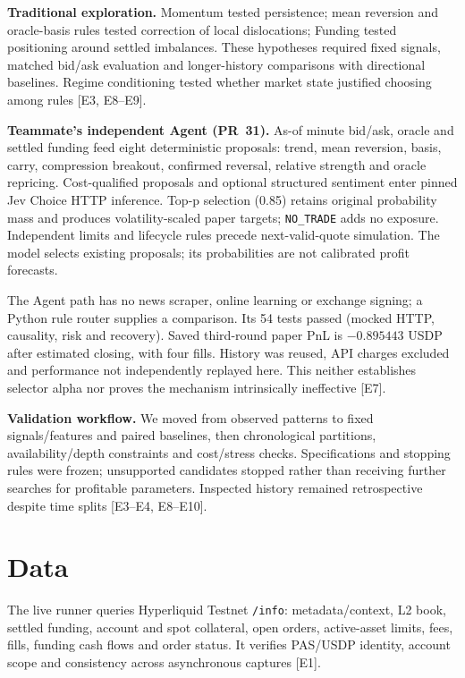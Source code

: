 \documentclass[a4paper]{article}
\begin{document}
\textbf{Traditional exploration.} Momentum tested persistence; mean reversion and oracle-basis rules tested correction of local dislocations; Funding tested positioning around settled imbalances. These hypotheses required fixed signals, matched bid/ask evaluation and longer-history comparisons with directional baselines. Regime conditioning tested whether market state justified choosing among rules [E3, E8--E9].

\textbf{Teammate's independent Agent (PR~31).} As-of minute bid/ask, oracle and settled funding feed eight deterministic proposals: trend, mean reversion, basis, carry, compression breakout, confirmed reversal, relative strength and oracle repricing. Cost-qualified proposals and optional structured sentiment enter pinned Jev Choice HTTP inference. Top-p selection (0.85) retains original probability mass and produces volatility-scaled paper targets; \texttt{NO\_TRADE} adds no exposure. Independent limits and lifecycle rules precede next-valid-quote simulation. The model selects existing proposals; its probabilities are not calibrated profit forecasts.

The Agent path has no news scraper, online learning or exchange signing; a Python rule router supplies a comparison. Its 54 tests passed (mocked HTTP, causality, risk and recovery). Saved third-round paper PnL is $-0.895443$ USDP after estimated closing, with four fills. History was reused, API charges excluded and performance not independently replayed here. This neither establishes selector alpha nor proves the mechanism intrinsically ineffective [E7].

\textbf{Validation workflow.} We moved from observed patterns to fixed signals/features and paired baselines, then chronological partitions, availability/depth constraints and cost/stress checks. Specifications and stopping rules were frozen; unsupported candidates stopped rather than receiving further searches for profitable parameters. Inspected history remained retrospective despite time splits [E3--E4, E8--E10].
\newpage

\section{Data}
The live runner queries Hyperliquid Testnet \texttt{/info}: metadata/context, L2 book, settled funding, account and spot collateral, open orders, active-asset limits, fees, fills, funding cash flows and order status. It verifies PAS/USDP identity, account scope and consistency across asynchronous captures [E1].
\end{document}

